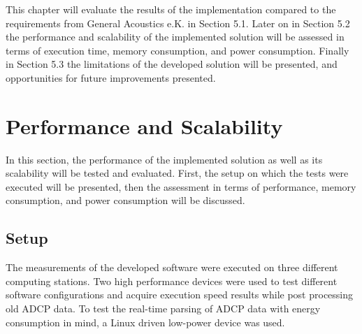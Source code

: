

This chapter will evaluate the results of the implementation compared to the requirements from General Acoustics e.K. in Section 5.1. Later on in Section 5.2 the performance and scalability of the implemented solution will be assessed in terms of execution time, memory consumption, and power consumption. Finally in Section 5.3 the limitations of the developed solution will be presented, and opportunities for future improvements presented.


\section{Performance and Scalability}
In this section, the performance of the implemented solution as well as its scalability will be tested and evaluated. First, the setup on which the tests were executed will be presented, then the assessment in terms of performance, memory consumption, and power consumption will be discussed. 
\subsection{Setup}
The measurements of the developed software were executed on three different computing stations. Two high performance devices were used to test different software configurations and acquire execution speed results while post processing old ADCP data. To test the real-time parsing of ADCP data with energy consumption in mind, a Linux driven low-power device was used.


